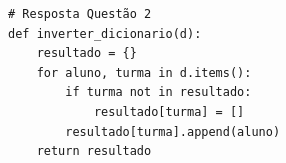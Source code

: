 \ifmostrarGabarito
\begin{verbatim}
# Resposta Questão 2
def inverter_dicionario(d):
    resultado = {}
    for aluno, turma in d.items():
        if turma not in resultado:
            resultado[turma] = []
        resultado[turma].append(aluno)
    return resultado
\end{verbatim}
\fi
